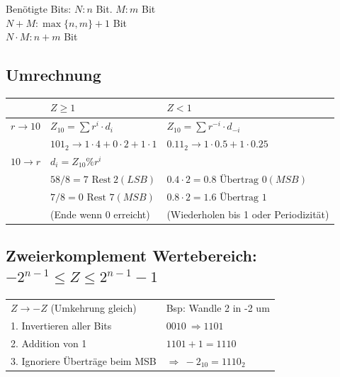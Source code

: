 \documentclass[6pt,a4paper]{scrartcl}
\newcommand{\ra}[0]{\ensuremath{\rightarrow}} 									%
\begin{document}
\begin{multicols*}{3}
Benötigte Bits: $N: n$ Bit.  $M: m$ Bit \\
$N + M: \max\{n,m\}+1$ Bit \\
$N \cdot M: n+m$ Bit
	\subsection{Umrechnung}
	\begin{tabular}{l|l|l}
			& $Z \ge 1$ & $Z < 1$\\ \midrule
		$r \rightarrow 10$ & $Z_{10} = \sum r^i \cdot d_i$ & $Z_{10} = \sum r^{-i} \cdot d_{-i}$\\
		& $101_2 \ra 1 \cdot 4 + 0\cdot 2 + 1 \cdot 1$ & $0.11_2 \ra 1\cdot 0.5 + 1\cdot 0.25$\\ \midrule
		$10 \rightarrow r$ & $d_i = Z_{10} \% r^i$ & \\
		& $58 / 8 = 7\text{ Rest}\ 2 (LSB)$ & $0.4 \cdot 2 = 0.8 \text{ Übertrag } 0 (MSB)$\\
		& $7 / 8 = 0\text{ Rest } 7 (MSB)$ & $0.8 \cdot 2 = 1.6 \text{ Übertrag } 1$ \\
		& (Ende wenn 0 erreicht) & (Wiederholen bis 1 oder Periodizität)
	\end{tabular}

	\subsection{Zweierkomplement \qquad Wertebereich: $-2^{n-1} \le Z \le 2^{n-1} -1$}
		\begin{tabular}{l|l}
			\textbf{$Z \rightarrow -Z$} (Umkehrung gleich) & Bsp: Wandle 2 in -2 um\\
			1. Invertieren aller Bits  & $0010 \ \Rightarrow 1101$\\
			2. Addition von 1	& $1101 + 1 = 1110$\\
			3. Ignoriere Überträge beim MSB & $\Rightarrow \ -2_{10} = 1110_2$\\
		\end{tabular}

\end{multicols*}
\end{document}
